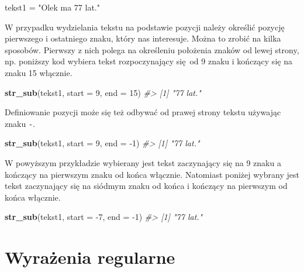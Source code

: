 \documentclass[paper=6in:9in,pagesize=pdftex,headinclude=on,footinclude=on,10pt]{scrbook}
\newenvironment{Shaded}{\begin{snugshade}}{\end{snugshade}}
\newcommand{\CommentTok}[1]{\textcolor[rgb]{0.56,0.35,0.01}{\textit{#1}}}
\newcommand{\DataTypeTok}[1]{\textcolor[rgb]{0.13,0.29,0.53}{#1}}
\newcommand{\DecValTok}[1]{\textcolor[rgb]{0.00,0.00,0.81}{#1}}
\newcommand{\KeywordTok}[1]{\textcolor[rgb]{0.13,0.29,0.53}{\textbf{#1}}}
\newcommand{\NormalTok}[1]{#1}
\newcommand{\StringTok}[1]{\textcolor[rgb]{0.31,0.60,0.02}{#1}}
\begin{document}
\begin{Shaded}
\begin{Highlighting}[]
\NormalTok{tekst1 =}\StringTok{ "Olek ma 77 lat."}
\end{Highlighting}
\end{Shaded}

W przypadku wydzielania tekstu na podstawie pozycji należy określić pozycję pierwszego i ostatniego znaku, który nas interesuje.
Można to zrobić na kilka sposobów.
Pierwszy z nich polega na określeniu położenia znaków od lewej strony, np. poniższy kod wybiera tekst rozpoczynający się~od 9 znaku i kończący się na znaku 15 włącznie.

\begin{Shaded}
\begin{Highlighting}[]
\KeywordTok{str_sub}\NormalTok{(tekst1, }\DataTypeTok{start =} \DecValTok{9}\NormalTok{, }\DataTypeTok{end =} \DecValTok{15}\NormalTok{)}
\CommentTok{#> [1] "77 lat."}
\end{Highlighting}
\end{Shaded}

Definiowanie pozycji może się też odbywać od prawej strony tekstu używając znaku \texttt{-}.

\begin{Shaded}
\begin{Highlighting}[]
\KeywordTok{str_sub}\NormalTok{(tekst1, }\DataTypeTok{start =} \DecValTok{9}\NormalTok{, }\DataTypeTok{end =} \DecValTok{-1}\NormalTok{)}
\CommentTok{#> [1] "77 lat."}
\end{Highlighting}
\end{Shaded}

W powyższym przykładzie wybierany jest tekst zaczynający się na 9 znaku a kończący na pierwszym znaku od końca włącznie.
Natomiast poniżej wybrany jest tekst zaczynający się na siódmym znaku od końca i kończący na pierwszym od końca włącznie.

\begin{Shaded}
\begin{Highlighting}[]
\KeywordTok{str_sub}\NormalTok{(tekst1, }\DataTypeTok{start =} \DecValTok{-7}\NormalTok{, }\DataTypeTok{end =} \DecValTok{-1}\NormalTok{)}
\CommentTok{#> [1] "77 lat."}
\end{Highlighting}
\end{Shaded}

\hypertarget{wyrazenia-regularne}{%
\section{Wyrażenia regularne}\label{wyrazenia-regularne}}
\end{document}
